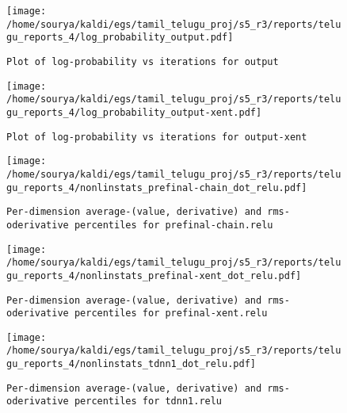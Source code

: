 \documentclass[prl,10pt,twocolumn]{revtex4}
\begin{document}
\newpage
\begin{figure}[h]
  \begin{center}
    \caption{\texttt{Plot of log-probability vs iterations for output}}
    \texttt{[image: /home/sourya/kaldi/egs/tamil\_telugu\_proj/s5\_r3/reports/telugu\_reports\_4/log\_probability\_output.pdf]}
  \end{center}
\end{figure}
\clearpage


\newpage
\begin{figure}[h]
  \begin{center}
    \caption{\texttt{Plot of log-probability vs iterations for output-xent}}
    \texttt{[image: /home/sourya/kaldi/egs/tamil\_telugu\_proj/s5\_r3/reports/telugu\_reports\_4/log\_probability\_output-xent.pdf]}
  \end{center}
\end{figure}
\clearpage


\newpage
\begin{figure}[h]
  \begin{center}
    \caption{\texttt{Per-dimension average-(value, derivative) and rms-oderivative percentiles for prefinal-chain.relu}}
    \texttt{[image: /home/sourya/kaldi/egs/tamil\_telugu\_proj/s5\_r3/reports/telugu\_reports\_4/nonlinstats\_prefinal-chain\_dot\_relu.pdf]}
  \end{center}
\end{figure}
\clearpage


\newpage
\begin{figure}[h]
  \begin{center}
    \caption{\texttt{Per-dimension average-(value, derivative) and rms-oderivative percentiles for prefinal-xent.relu}}
    \texttt{[image: /home/sourya/kaldi/egs/tamil\_telugu\_proj/s5\_r3/reports/telugu\_reports\_4/nonlinstats\_prefinal-xent\_dot\_relu.pdf]}
  \end{center}
\end{figure}
\clearpage


\newpage
\begin{figure}[h]
  \begin{center}
    \caption{\texttt{Per-dimension average-(value, derivative) and rms-oderivative percentiles for tdnn1.relu}}
    \texttt{[image: /home/sourya/kaldi/egs/tamil\_telugu\_proj/s5\_r3/reports/telugu\_reports\_4/nonlinstats\_tdnn1\_dot\_relu.pdf]}
  \end{center}
\end{figure}
\clearpage
\end{document}
